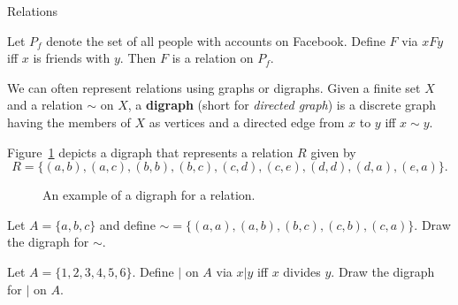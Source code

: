 \begin{section}{Relations}
\begin{example}
Let $P_f$ denote the set of all people with accounts on Facebook.  Define  $F$ via $xFy$ iff $x$ is friends with $y$.  Then $F$ is a relation on $P_f$.
\end{example}

We can often represent relations using graphs or digraphs.  Given a finite set $X$ and a relation $\sim$ on $X$, a \textbf{digraph} (short for \emph{directed graph}) is a discrete graph having the members of $X$ as vertices and a directed edge from $x$ to $y$ iff $x\sim y$.

\begin{example}
Figure~\ref{fig:digraph} depicts a digraph that represents a relation $R$ given by
\[
R=\{(a,b),(a,c),(b,b),(b,c),(c,d),(c,e),(d,d),(d,a),(e,a)\}.
\]

\begin{figure}[h!]
\begin{center}
\caption{An example of a digraph for a relation.}\label{fig:digraph}
\end{center}
\end{figure}

\end{example}

\begin{exercise}
Let $A=\{a,b,c\}$ and define $\sim=\{(a,a),(a,b),(b,c),(c,b),(c,a)\}$.  Draw the digraph for $\sim$.
\end{exercise}

\begin{exercise}
Let $A=\{1,2,3,4,5,6\}$.  Define $|$ on $A$ via $x|y$ iff $x$ divides $y$.  Draw the digraph for $|$ on $A$.
\end{exercise}


\end{section}

